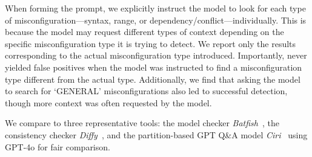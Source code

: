 When forming the prompt, we explicitly instruct the model to look for each type of misconfiguration—syntax, range, or dependency/conflict—individually. This is because the model may request different types of context depending on the specific misconfiguration type it is trying to detect. We report only the results corresponding to the actual misconfiguration type introduced. Importantly, \sysname{} never yielded false positives when the model was instructed to find a misconfiguration type different from the actual type. Additionally, we find that asking the model to search for `GENERAL' misconfigurations also led to successful detection, though more context was often requested by the model.

We compare \sysname{} to three representative tools: the model checker \textit{Batfish}~\cite{fogel2015general},  the consistency checker \textit{Diffy}~\cite{kakarla2024diffy}, and the partition-based GPT Q\&A model \textit{Ciri}~\cite{lian2023configuration} using GPT-4o for fair comparison. 

\begin{table}[thb]
\centering
{}
\caption{Synthetic Misconfiguration Detection Results.}
\label{tab:syn_result}
\end{table}

